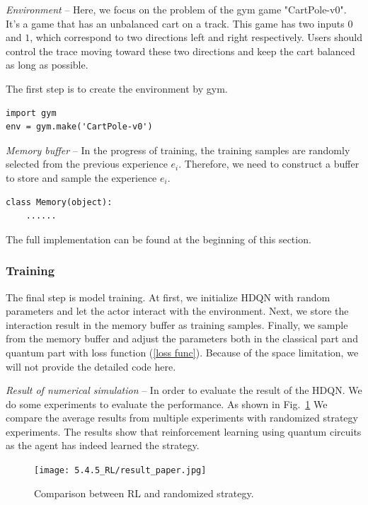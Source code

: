\textit{Environment} -- Here, we focus on the problem of the gym game "CartPole-v0". It's a game that has an unbalanced cart on a track. This game has two inputs $0$ and $1$, which correspond to two directions left and right respectively. Users should control the trace moving toward these two directions and keep the cart balanced as long as possible.

The first step is to create the environment by gym.
\begin{lstlisting}
import gym
env = gym.make('CartPole-v0')
\end{lstlisting}
\textit{Memory buffer} -- In the progress of training, the training samples are randomly selected from the previous experience $e_i$. Therefore, we need to construct a buffer to store and sample the experience $e_i$.
\begin{lstlisting}
class Memory(object):
    ......
\end{lstlisting}

The full implementation can be found at the beginning of this section.

\subsubsection{Training}
The final step is model training. At first, we initialize HDQN with random parameters and let the actor interact with the environment. Next, we store the interaction result in the memory buffer as training samples. Finally, we sample from the memory buffer and adjust the parameters both in the classical part and quantum part with loss function (\ref{loss func}). Because of the space limitation, we will not provide the detailed code here.

\textit{Result of numerical simulation} -- In order to evaluate the result of the HDQN. We do some experiments to evaluate the performance. As shown in Fig.~\ref{stochastic} We compare the average results from multiple experiments with randomized strategy experiments. The results show that reinforcement learning using quantum circuits as the agent has indeed learned the strategy.
\begin{figure}[ht]
  \centering
  \texttt{[image: 5.4.5\_RL/result\_paper.jpg]}
  \caption{\label{stochastic} Comparison between RL and randomized strategy.}
\end{figure}
